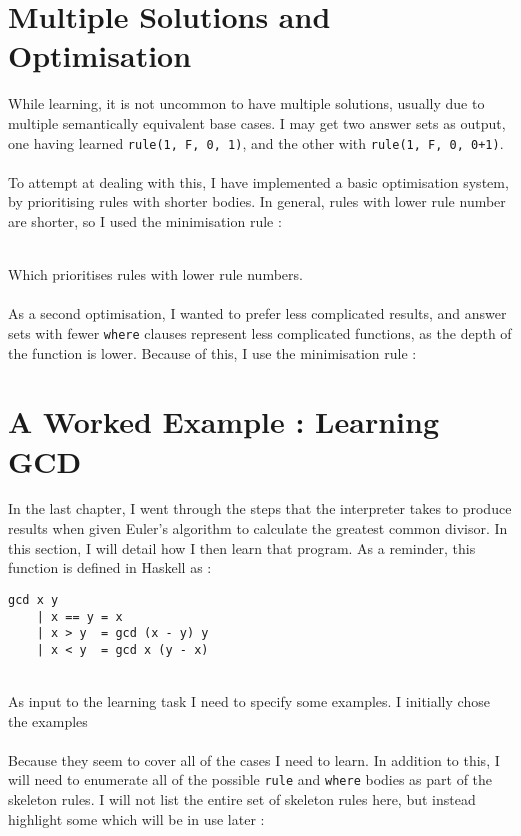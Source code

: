 \section{Multiple Solutions and Optimisation}
While learning, it is not uncommon to have multiple solutions, usually due to multiple semantically equivalent base cases. I may get two answer sets as output, one having learned \lstinline{rule(1, F, 0, 1)}, and the other with \lstinline{rule(1, F, 0, 0+1)}. \\ \\
To attempt at dealing with this, I have implemented a basic optimisation system, by prioritising rules with shorter bodies. In general, rules with lower rule number are shorter, so I used the minimisation rule :


\mbox{}\\
Which prioritises rules with lower rule numbers.\\ \\
As a second optimisation, I wanted to prefer less complicated results, and answer sets with fewer \lstinline{where} clauses represent less complicated functions, as the depth of the function is lower. Because of this, I use the minimisation rule : \\ %



\section{A Worked Example : Learning GCD}
In the last chapter, I went through the steps that the interpreter takes to produce results when given Euler's algorithm to calculate the greatest common divisor. In this section, I will detail how I then learn that program. As a reminder, this function is defined in Haskell as :

\begin{lstlisting}
gcd x y
	| x == y = x
	| x > y	 = gcd (x - y) y
	| x < y	 = gcd x (y - x)
\end{lstlisting}
\mbox{}\\
As input to the learning task I need to specify some examples. I initially chose the examples \\


\mbox{}\\
Because they seem to cover all of the cases I need to learn. In addition to this, I will need to enumerate all of the possible \lstinline{rule} and \lstinline{where} bodies as part of the skeleton rules. I will not list the entire set of skeleton rules here, but instead highlight some which will be in use later : \\

